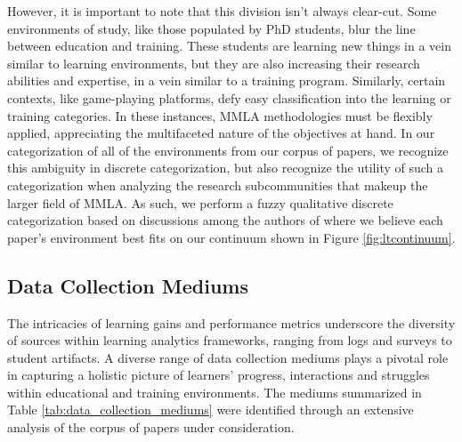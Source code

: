 \documentclass[manuscript,screen,review]{acmart}
\begin{document}
However, it is important to note that this division isn't always clear-cut. Some environments of study, like those populated by PhD students, blur the line between education and training. These students are learning new things in a vein similar to learning environments, but they are also increasing their research abilities and expertise, in a vein similar to a training program. Similarly, certain contexts, like game-playing platforms, defy easy classification into the learning or training categories. In these instances, MMLA methodologies must be flexibly applied, appreciating the multifaceted nature of the objectives at hand. In our categorization of all of the environments from our corpus of papers, we recognize this ambiguity in discrete categorization, but also recognize the utility of such a categorization when analyzing the research subcommunities that makeup the larger field of MMLA. As such, we perform a fuzzy qualitative discrete categorization based on discussions among the authors of where we believe each paper’s environment best fits on our continuum shown in Figure \ref{fig:ltcontinuum}.

\subsection{Data Collection Mediums} \label{subsec:data_collection_mediums}

The intricacies of learning gains and performance metrics underscore the diversity of sources within learning analytics frameworks, ranging from logs and surveys to student artifacts.  A diverse range of data collection mediums plays a pivotal role in capturing a holistic picture of learners' progress, interactions and struggles within educational and training environments. The mediums summarized in Table \ref{tab:data_collection_mediums} were identified through an extensive analysis of the corpus of papers under consideration.
\end{document}
